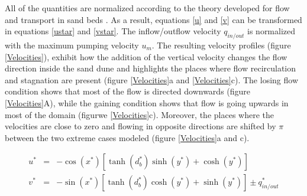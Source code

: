 \documentclass[draft,linenumbers]{agujournal2018}
\begin{document}
All of the quantities are normalized according to the theory developed for flow and transport in sand beds \citep{Elliott1997,Packman2000}. As a result, equations \ref{u} and \ref{v} can be transformed in equations \ref{ustar} and \ref{vstar}. The inflow/outflow velocity $q_{in/out}$ is normalized with the maximum pumping velocity $u_m$. The resulting velocity profiles (figure \ref{Velocities}), exhibit how the addition of the vertical velocity changes the flow direction inside the sand dune and highlights the places where flow recirculation and stagnation are present (figure \ref{Velocities}a and \ref{Velocities}c). The losing flow condition shows that most of the flow is directed downwards (figure \ref{Velocities}A), while the gaining condition shows that flow is going upwards in most of the domain (figurwe \ref{Velocities}c). Moreover, the places where the velocities are close to zero and flowing in opposite directions are shifted by $\pi$ between the two extreme cases modeled (figure \ref{Velocities}a and c). 

\begin{eqnarray}
\label{ustar}
  u^* & = & -\cos(x^*)[\tanh(d_b^*)\sinh(y^*) + \cosh(y^*)]\\
\label{vstar}
  v^* & = & -\sin(x^*)[\tanh(d_b^*)\cosh(y^*) + \sinh(y^*)] \pm q_{in/out}^*
\end{eqnarray}
\end{document}

